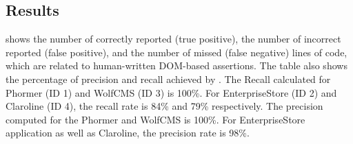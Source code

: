 \subsection{Results} \label{Sec:results}
 shows the number of  correctly reported (true positive), the number of incorrect reported (false positive), and the number of missed (false negative) \javascript lines of code, which are related to human-written DOM-based assertions. The table also shows the percentage of precision and recall achieved by \tool. The Recall calculated for Phormer (ID 1) and WolfCMS (ID 3) is 100\%. For EnterpriseStore (ID 2) and Claroline (ID 4), the recall rate is 84\% and 79\% respectively. The precision computed for the Phormer and WolfCMS is 100\%. For EnterpriseStore application as well as Claroline, the precision rate is 98\%.

